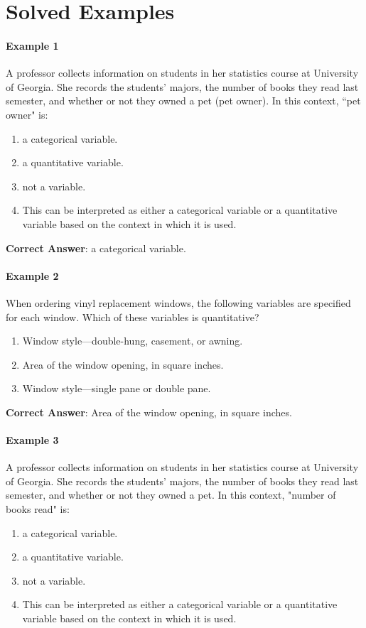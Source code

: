 \section{Solved Examples}

\paragraph{Example 1}
A professor collects information on students in her statistics course at University of Georgia. She records the students' majors, the number of books they read last semester, and whether or not they owned a pet (pet owner). In this context, “pet owner" is:
\begin{enumerate}[label=\alph*.]
    \item a categorical variable.
    \item a quantitative variable.
    \item not a variable.
    \item This can be interpreted as either a categorical variable or a quantitative variable based on the context in which it is used.
\end{enumerate}

\textbf{Correct Answer}: a categorical variable.

\paragraph{Example 2}
When ordering vinyl replacement windows, the following variables are specified for each window. Which of these variables is quantitative?
\begin{enumerate}[label=\alph*.]
    \item Window style—double-hung, casement, or awning.
    \item Area of the window opening, in square inches.
    \item Window style—single pane or double pane.
\end{enumerate}

\textbf{Correct Answer}: Area of the window opening, in square inches.

\paragraph{Example 3}
A professor collects information on students in her statistics course at University of Georgia. She records the students' majors, the number of books they read last semester, and whether or not they owned a pet. In this context, "number of books read" is:
\begin{enumerate}[label=\alph*.]
    \item a categorical variable.
    \item a quantitative variable.
    \item not a variable.
    \item This can be interpreted as either a categorical variable or a quantitative variable based on the context in which it is used.
\end{enumerate}

